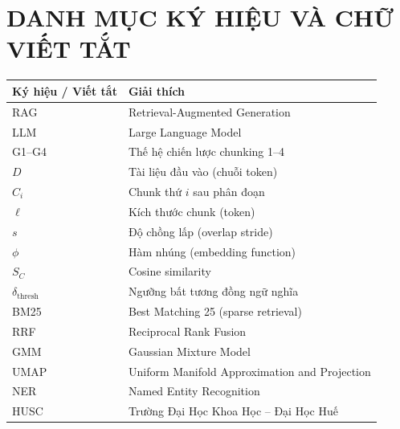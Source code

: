 \documentclass[12pt,a4paper]{report}
\theoremstyle{plain}
\theoremstyle{definition}
\begin{document}
	\clearpage
	
	\tableofcontents
	\clearpage
	\listoffigures
	\clearpage
	\listoftables
	\clearpage
	
	\section*{DANH MỤC KÝ HIỆU VÀ CHỮ VIẾT TẮT}
	
	\begin{table}[h]
		\centering
		\begin{tabular}{ll}
			\toprule
			\textbf{Ký hiệu / Viết tắt} & \textbf{Giải thích} \\
			\midrule
			RAG     & Retrieval-Augmented Generation \\
			LLM     & Large Language Model \\
			G1--G4  & Thế hệ chiến lược chunking 1--4 \\
			$D$     & Tài liệu đầu vào (chuỗi token) \\
			$C_i$   & Chunk thứ $i$ sau phân đoạn \\
			$\ell$  & Kích thước chunk (token) \\
			$s$     & Độ chồng lấp (overlap stride) \\
			$\phi$  & Hàm nhúng (embedding function) \\
			$S_C$   & Cosine similarity \\
			$\delta_{\text{thresh}}$ & Ngưỡng bất tương đồng ngữ nghĩa \\
			BM25    & Best Matching 25 (sparse retrieval) \\
			RRF     & Reciprocal Rank Fusion \\
			GMM     & Gaussian Mixture Model \\
			UMAP    & Uniform Manifold Approximation and Projection \\
			NER     & Named Entity Recognition \\
			HUSC    & Trường Đại Học Khoa Học -- Đại Học Huế \\
			\bottomrule
		\end{tabular}
	\end{table}
	\clearpage
	
\end{document}

